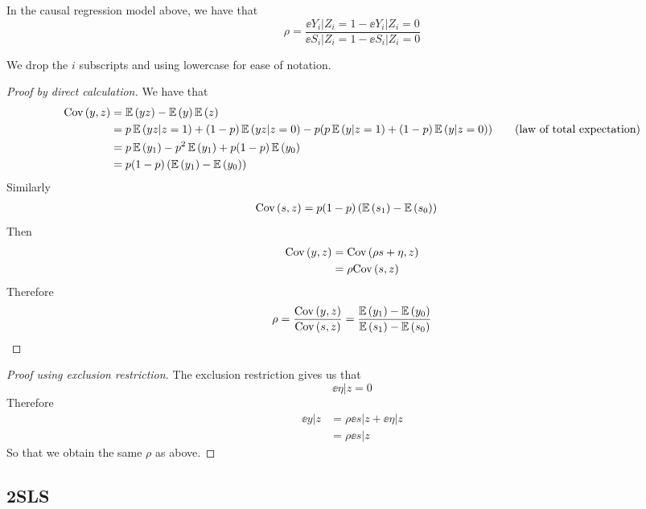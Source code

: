 \documentclass[11pt]{article}
\begin{document}
\begin{claim}
	In the causal regression model above, we have that
	\begin{equation}
		\rho = \frac{\ee{Y_i | Z_i = 1} - \ee{Y_i | Z_i = 0}}{\ee{S_i | Z_i = 1} - \ee{S_i | Z_i = 0}}
	\end{equation}
\end{claim}

We drop the $i$ subscripts and using lowercase for ease of notation.
\begin{proof}[Proof by direct calculation]
	We have that
	\begin{align*}
		\cov{y,z} &= \ee{yz} - \ee{y}\ee{z} \\
		&= p\ee{y z | z = 1} + (1-p)\ee{y z | z = 0} - p(p \ee{y | z = 1} + (1-p)\ee{y | z = 0}) \tag{law of total expectation} \\
		&= p \ee{y_1} - p^2 \ee{y_1} + p(1-p)\ee{y_0} \\
		&= p(1-p)\parens{\ee{y_1} - \ee{y_0}}
	\end{align*}
	Similarly
	\begin{align*}
		\cov{s,z} &= p(1-p)\parens{\ee{s_1} - \ee{s_0}}
	\end{align*}
	Then
	\begin{align*}
		\cov{y,z} &= \cov{\rho s + \eta, z} \\
		&= \rho \cov{s, z}
	\end{align*}
	Therefore
	\begin{equation}
		\rho = \frac{\cov{y,z}}{\cov{s, z}} = \frac{\ee{y_1}-\ee{y_0}}{\ee{s_1}-\ee{s_0}}
	\end{equation}
	
	
\end{proof}


\begin{proof}[Proof using exclusion restriction]
	The exclusion restriction gives us that
	\begin{equation}
		\ee{\eta | z = 0}
	\end{equation}
	Therefore
	\begin{align*}
		\ee{y|z} &= \rho \ee{s|z} + \ee{\eta|z} \\
		&= \rho \ee{s|z}
	\end{align*}
	So that we obtain the same $\rho$ as above.

\end{proof}

\subsection{2SLS}
\end{document}
